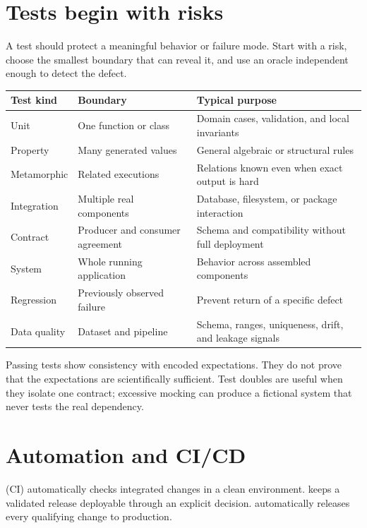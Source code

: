 \section{Tests begin with risks}

A test should protect a meaningful behavior or failure mode. Start with a risk,
choose the smallest boundary that can reveal it, and use an oracle independent
enough to detect the defect.

\begin{longtable}{@{}p{}p{}p{}@{}}
\toprule
Test kind & Boundary & Typical purpose \\
\midrule
\endhead
Unit & One function or class & Domain cases, validation, and local invariants \\
Property & Many generated values & General algebraic or structural rules \\
Metamorphic & Related executions & Relations known even when exact output is hard \\
Integration & Multiple real components & Database, filesystem, or package interaction \\
Contract & Producer and consumer agreement & Schema and compatibility without full deployment \\
System & Whole running application & Behavior across assembled components \\
Regression & Previously observed failure & Prevent return of a specific defect \\
Data quality & Dataset and pipeline & Schema, ranges, uniqueness, drift, and leakage signals \\
\bottomrule
\end{longtable}

Passing tests show consistency with encoded expectations. They do not prove
that the expectations are scientifically sufficient. Test doubles are useful
when they isolate one contract; excessive mocking can produce a fictional
system that never tests the real dependency.

\section{Automation and CI/CD}

 (CI) automatically checks integrated changes in
a clean environment.  keeps a validated release
deployable through an explicit decision. 
automatically releases every qualifying change to production.

